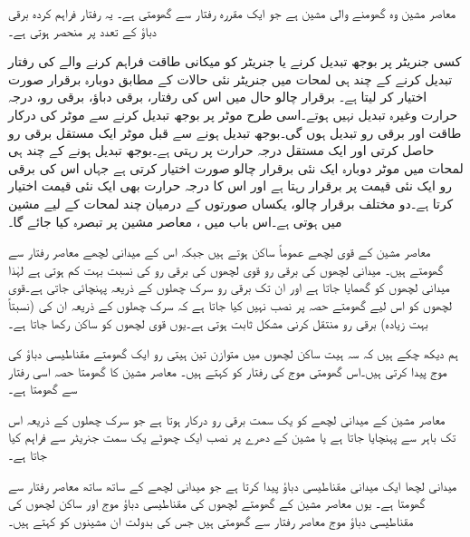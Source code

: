 معاصر مشین وہ گھومنے والی مشین ہے جو ایک مقررہ رفتار سے گھومتی ہے۔ یہ رفتار فراہم کردہ برقی دباؤ کے تعدد پر منحصر ہوتی ہے۔

کسی جنریٹر پر بوجھ تبدیل کرنے یا جنریٹر کو میکانی طاقت فراہم کرنے والے کی رفتار تبدیل کرنے کے چند ہی لمحات  میں جنریٹر نئی حالات کے  مطابق  دوبارہ برقرار  صورت اختیار کر لیتا ہے۔ برقرار چالو حال میں اس کی رفتار، برقی دباؤ، برقی رو، درجہ حرارت وغیرہ  تبدیل نہیں ہوتے۔اسی طرح  موٹر پر بوجھ تبدیل کرنے سے موٹر کی درکار طاقت اور برقی رو تبدیل ہوں گی۔بوجھ تبدیل ہونے سے قبل موٹر  ایک مستقل برقی رو حاصل کرتی  اور ایک مستقل درجہ حرارت  پر رہتی ہے۔بوجھ تبدیل ہونے کے چند ہی لمحات میں موٹر دوبارہ ایک نئی برقرار چالو صورت اختیار کرتی ہے جہاں اس کی  برقی رو ایک نئی قیمت پر برقرار رہتا ہے اور اس کا درجہ حرارت بھی ایک نئی قیمت اختیار کرتا ہے۔دو مختلف برقرار چالو، یکساں صورتوں کے درمیان چند لمحات کے لیے مشین  میں ہوتی ہے۔اس باب میں ،  معاصر مشین پر تبصرہ کیا جائے گا۔ 

معاصر مشین کے قوی لچھے عموماً ساکن ہوتے ہیں  جبکہ اس کے میدانی لچھے معاصر رفتار سے گھومتے ہیں۔ میدانی لچھوں کی  برقی رو قوی لچھوں کی  برقی رو کی نسبت  بہت کم ہوتی ہے لہٰذا میدانی لچھوں کو گھمایا جاتا ہے اور ان تک برقی رو سرک چھلوں کے ذریعہ پہنچائی  جاتی ہے۔قوی لچھوں کو اس لیے گھومتے حصہ پر نصب نہیں کیا جاتا ہے کہ سرک چھلوں کے ذریعہ ان کی (نسبتاً بہت  زیادہ) برقی رو منتقل کرنی مشکل ثابت ہوتی ہے۔یوں قوی لچھوں کو ساکن رکھا جاتا ہے۔

 ہم  دیکھ چکے ہیں کہ سہ ہیت ساکن لچھوں میں  متوازن تین ہیتی رو  ایک گھومتے مقناطیسی دباؤ کی موج پیدا کرتی  ہیں۔اس گھومتی موج کی رفتار کو   کہتے ہیں۔ معاصر مشین کا گھومتا حصہ اسی رفتار سے گھومتا ہے۔ 

معاصر مشین کے میدانی لچھے کو یک سمت  برقی رو درکار ہوتا ہے جو  سرک چھلوں کے ذریعہ اس تک باہر سے پہنچایا جاتا ہے یا  مشین کے دھرے پر  نصب ایک چھوٹے یک سمت  جنریٹر سے  فراہم کیا جاتا ہے۔

میدانی لچھا ایک میدانی مقناطیسی دباؤ پیدا کرتا ہے جو میدانی لچھے کے ساتھ ساتھ معاصر رفتار سے گھومتا ہے۔ یوں معاصر مشین کے گھومتے لچھوں کی مقناطیسی دباؤ موج  اور ساکن لچھوں کی مقناطیسی دباؤ موج معاصر رفتار سے  گھومتی ہیں جس کی بدولت  ان مشینوں کو   کہتے ہیں۔

